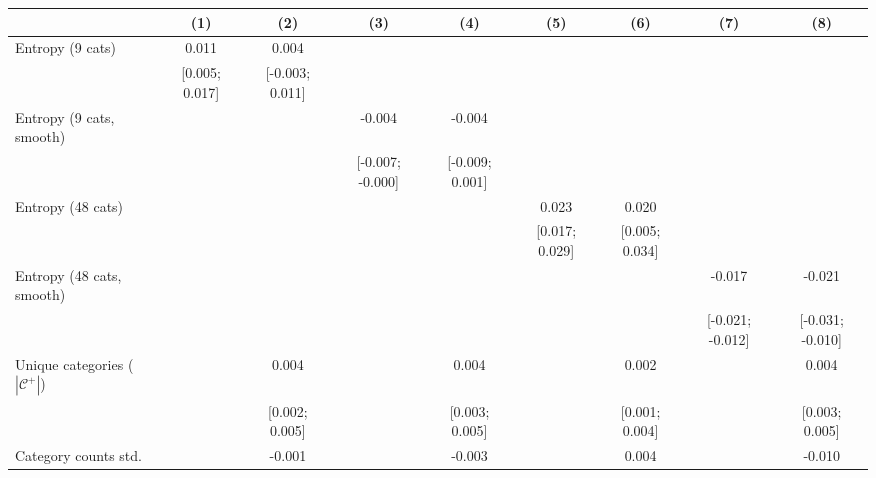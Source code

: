 
\begingroup
\centering
\begin{tabular}{lcccccccc}
   \toprule
                                          & (1)            & (2)             & (3)              & (4)             & (5)            & (6)             & (7)              & (8)\\  
   \midrule 
   Entropy (9 cats)                       & 0.011          & 0.004           &                  &                 &                &                 &                  &   \\   
                                          & [0.005; 0.017] & [-0.003; 0.011] &                  &                 &                &                 &                  &   \\   
   Entropy (9 cats, smooth)               &                &                 & -0.004           & -0.004          &                &                 &                  &   \\   
                                          &                &                 & [-0.007; -0.000] & [-0.009; 0.001] &                &                 &                  &   \\   
   Entropy (48 cats)                      &                &                 &                  &                 & 0.023          & 0.020           &                  &   \\   
                                          &                &                 &                  &                 & [0.017; 0.029] & [0.005; 0.034]  &                  &   \\   
   Entropy (48 cats, smooth)              &                &                 &                  &                 &                &                 & -0.017           & -0.021\\   
                                          &                &                 &                  &                 &                &                 & [-0.021; -0.012] & [-0.031; -0.010]\\   
   Unique categories ($|\mathcal{C}^+|$)  &                & 0.004           &                  & 0.004           &                & 0.002           &                  & 0.004\\   
                                          &                & [0.002; 0.005]  &                  & [0.003; 0.005]  &                & [0.001; 0.004]  &                  & [0.003; 0.005]\\   
   Category counts std.                   &                & -0.001          &                  & -0.003          &                & 0.004           &                  & -0.010\\   

\end{tabular}
